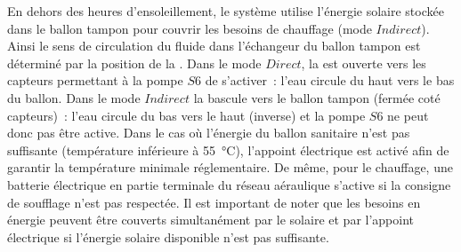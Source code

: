 En dehors des heures d’ensoleillement, le système utilise l’énergie solaire stockée dans
le ballon tampon pour couvrir les besoins de chauffage (mode $Indirect$). Ainsi le sens de
circulation du fluide dans l’échangeur du ballon tampon est déterminé par la position de
la . Dans le mode $Direct$, la  est ouverte vers les capteurs permettant à la
pompe $S6$ de s’activer~: l’eau circule du haut vers le bas du ballon. Dans le mode
$Indirect$ la  bascule vers le ballon tampon (fermée coté capteurs)~: l’eau circule
du bas vers le haut (inverse) et la pompe $S6$ ne peut donc pas être active.
Dans le cas où l’énergie du ballon sanitaire n’est pas suffisante (température inférieure
à \SI{55}{\celsius}), l’appoint électrique est activé afin de garantir la température
minimale réglementaire. De même, pour le chauffage, une batterie électrique en partie
terminale du réseau aéraulique s’active si la consigne de soufflage n’est pas respectée.
Il est important de noter que les besoins en énergie peuvent être couverts simultanément
par le solaire et par l’appoint électrique si l’énergie solaire disponible n’est pas
suffisante.


